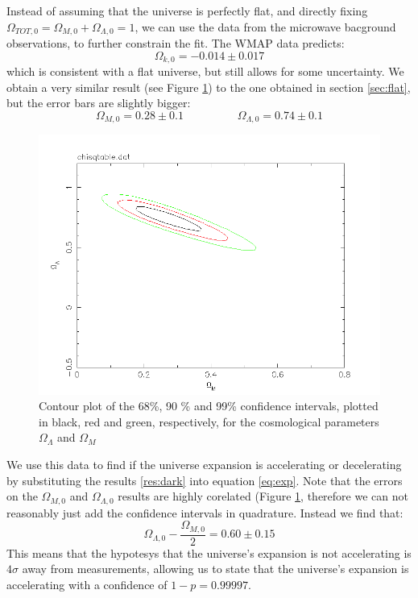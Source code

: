 \documentclass[11pt]{article}
\begin{document}
Instead of assuming that the universe is perfectly flat, and directly fixing $\Omega_{TOT,0} = \Omega_{M,0} + \Omega_{\Lambda,0} = 1$, we can use the data from the microwave bacground observations, to further constrain the fit. The WMAP data predicts:
\begin{equation}
	\Omega_{k,0} = -0.014 \pm 0.017
	\label{res:WMAP}
\end{equation}
which is consistent with a flat universe, but still allows for some uncertainty. We obtain a very similar result (see Figure \ref{fig:dark}) to the one obtained in section \ref{sec:flat}, but the error bars are slightly bigger: 
\begin{equation}
	\Omega_{M,0} = 0.28 \pm 0.1
	\hspace{2cm}
	\Omega_{\Lambda,0} = 0.74 \pm 0.1
	\label{res:dark}
\end{equation}
\begin{figure}[htbp]
	\centering
	\includegraphics[width=0.8\linewidth]{dark.png}
	\caption{Contour plot of the 68\%, 90 \% and 99\% confidence intervals, plotted in black, red and green, respectively, for the cosmological parameters $\Omega_\Lambda$ and $\Omega_M$}
	\label{fig:dark}
\end{figure}
We use this data to find if the universe expansion is accelerating or decelerating by substituting the results \eqref{res:dark} into equation \eqref{eq:exp}. Note that the errors on the $\Omega_{M,0}$ and $\Omega_{\Lambda,0}$ results are highly corelated (Figure \ref{fig:dark}, therefore we can not reasonably just add the confidence intervals in quadrature. Instead we find that: 
\begin{equation}
	\Omega_{\Lambda,0} - \frac{\Omega_{M,0}}{2} = 0.60 \pm 0.15
\end{equation}
This means that the hypotesys that the universe's expansion is not accelerating is $4 \sigma$ away from measurements, allowing us to state that the universe's expansion is accelerating with a confidence of $1-p = 0.99997$. 
\end{document}
